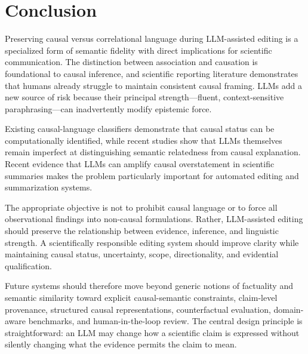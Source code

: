 \documentclass[11pt]{article}
\begin{document}
\section{Conclusion}
\label{sec:conclusion}

Preserving causal versus correlational language during LLM-assisted editing is a specialized form of semantic fidelity with direct implications for scientific communication. The distinction between association and causation is foundational to causal inference, and scientific reporting literature demonstrates that humans already struggle to maintain consistent causal framing. LLMs add a new source of risk because their principal strength---fluent, context-sensitive paraphrasing---can inadvertently modify epistemic force.

Existing causal-language classifiers demonstrate that causal status can be computationally identified, while recent studies show that LLMs themselves remain imperfect at distinguishing semantic relatedness from causal explanation. Recent evidence that LLMs can amplify causal overstatement in scientific summaries makes the problem particularly important for automated editing and summarization systems.

The appropriate objective is not to prohibit causal language or to force all observational findings into non-causal formulations. Rather, LLM-assisted editing should preserve the relationship between evidence, inference, and linguistic strength. A scientifically responsible editing system should improve clarity while maintaining causal status, uncertainty, scope, directionality, and evidential qualification.

Future systems should therefore move beyond generic notions of factuality and semantic similarity toward explicit causal-semantic constraints, claim-level provenance, structured causal representations, counterfactual evaluation, domain-aware benchmarks, and human-in-the-loop review. The central design principle is straightforward: an LLM may change how a scientific claim is expressed without silently changing what the evidence permits the claim to mean.



\end{document}
